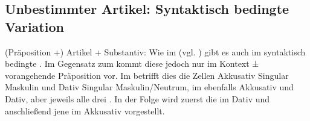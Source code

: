 \subsection{Unbestimmter Artikel: Syntaktisch bedingte Variation}\label{5.6.4}

{(Präposition +) Artikel + Substantiv}: Wie im  (vgl. ) gibt es auch im  syntaktisch bedingte . Im Gegensatz zum  kommt diese jedoch nur im Kontext ± vorangehende Präposition vor. Im  betrifft dies die Zellen Akkusativ Singular Maskulin und Dativ Singular Maskulin/Neutrum, im  ebenfalls Akkusativ und Dativ, aber jeweils alle drei . In der Folge wird zuerst die  im Dativ und anschließend jene im Akkusativ vorgestellt.

